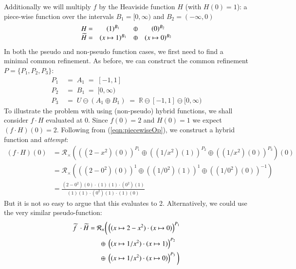Additionally we will multiply $f$ by the Heaviside function $H$ (with $H(0)=1$): a piece-wise function over the intervals
$B_1 = [0, \infty)$ and $B_2 = (-\infty, 0)$
\begin{equation*}
	\begin{array}{r c c c}
		H			=& (1)^{B_1} 			&\oplus& 	(0)^{B_2} \\
		\,\pseudo{\!H} 	=& (x \mapsto 1)^{B_1}	&\oplus& 	(x \mapsto 0)^{B_2}
	\end{array}
\end{equation*}
In both the pseudo and non-pseudo function cases, we first need to find a minimal common refinement.
As before, we can construct the common refinement ${P = \{ P_1, P_2, P_3 \}}$:
\begin{align*}
	P_1 &\;=\; A_1 \;=\; [-1,1] \\
	P_2 &\;=\; B_1 \;=\;  [0, \infty) \\
	P_3 &\;=\; U \ominus (A_1 \oplus B_1) \;=\;  \mathbb{R} \ominus [-1,1] \ominus [0, \infty)
\end{align*}
To illustrate the problem with using (non-pseudo) hybrid functions, we shall consider $f\cdot H$ evaluated at 0. 
Since $f(0)=2$ and $H(0)=1$ we expect $(f\cdot H)(0)=2$.
Following from (\ref{eqn:piecewiseOp}), we construct a hybrid function and \emph{attempt}:
\begin{align*}
	(f \cdot H)(0) 
		&= \mathcal{R}_\times \left( 
			\left( (2-x^2)(0) \right)^{P_1} \oplus 
			\left( (1/x^2)(1) \right)^{P_2} \oplus 
			\left( (1/x^2)(0) \right)^{P_3} \right)(0) \\
		&= \mathcal{R}_\times \left( 
			\left( (2-0^2)(0) \right)^{1} \oplus 
			\left( (1/0^2)(1) \right)^{1} \oplus 
			\left( (1/0^2)(0) \right)^{-1} \right)\\
		& = \frac{(2-0^2)(0) \cdot (1)(1) \cdot (0^2)(1)}{(1)(1) \cdot (0^2)(1) \cdot (1)(0)}
\end{align*}
But it is not so easy to argue that this evaluates to 2.
Alternatively, we could use the very similar pseudo-function:
\begin{align*}
	\pseudo{f\;} \cdot \,\pseudo{\!H} = \mathcal{R}_\times \bigg(
				& \left( (x \mapsto 2-x^2) \cdot (x \mapsto 0) \right)^{P_1} \notag \\
		\oplus \;& \left( (x \mapsto 1/x^2) \cdot (x \mapsto 1) \right)^{P_2} \notag \\
		\oplus \;& \left( (x \mapsto 1/x^2) \cdot (x \mapsto 0) \right)^{P_3} 
	\bigg)
\end{align*}


